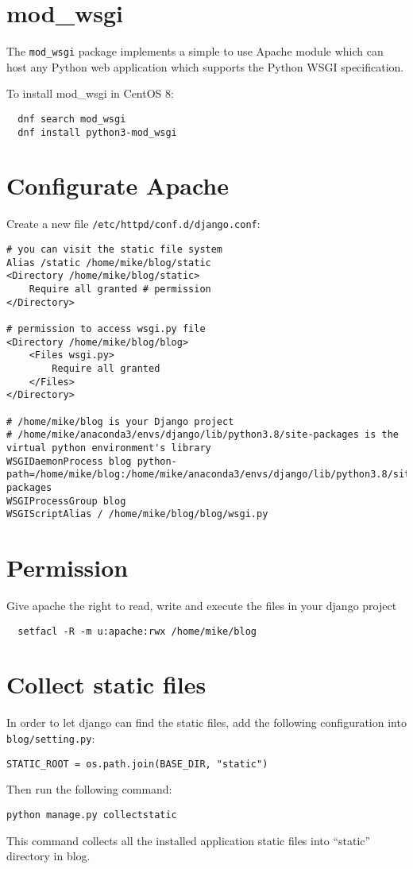 \section{mod\_wsgi}

The \verb|mod_wsgi| package implements a simple to use Apache module which can host any Python web application which supports the Python WSGI specification.

To install mod\_wsgi in CentOS 8:
\begin{lstlisting}
  dnf search mod_wsgi
  dnf install python3-mod_wsgi
\end{lstlisting}

\section{Configurate Apache}
Create a new file \verb|/etc/httpd/conf.d/django.conf|:

\lstset{language=Python}
\begin{lstlisting}
# you can visit the static file system  
Alias /static /home/mike/blog/static 
<Directory /home/mike/blog/static>
    Require all granted # permission
</Directory>

# permission to access wsgi.py file
<Directory /home/mike/blog/blog> 
    <Files wsgi.py>
        Require all granted
    </Files>
</Directory>

# /home/mike/blog is your Django project
# /home/mike/anaconda3/envs/django/lib/python3.8/site-packages is the virtual python environment's library
WSGIDaemonProcess blog python-path=/home/mike/blog:/home/mike/anaconda3/envs/django/lib/python3.8/site-packages
WSGIProcessGroup blog
WSGIScriptAlias / /home/mike/blog/blog/wsgi.py
\end{lstlisting}


\section{Permission}
Give apache the right to read, write and execute the files in your django project
\begin{lstlisting}
  setfacl -R -m u:apache:rwx /home/mike/blog
\end{lstlisting}


\section{Collect static files}

In order to let django can find the static files,
add the following configuration into \verb|blog/setting.py|:
\begin{lstlisting}
STATIC_ROOT = os.path.join(BASE_DIR, "static")
\end{lstlisting}

Then run the following command:
\lstset{language=Sh}
\begin{lstlisting}
python manage.py collectstatic  
\end{lstlisting}
This command collects all the installed application static files into ``static'' directory in blog.